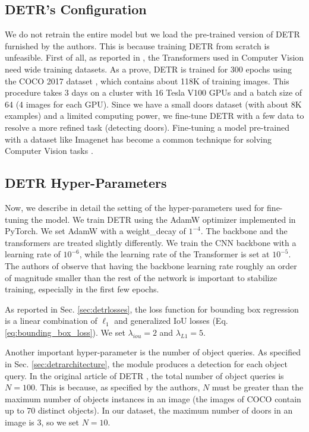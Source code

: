 \subsection{DETR's Configuration}
\label{sec:detr_configuration}
We do not retrain the entire model but we load the pre-trained version of DETR furnished by the authors. This is because training DETR from scratch is unfeasible. First of all, as reported in \cite{surveytransformer}, the Transformers used in Computer Vision need wide training datasets. As a prove, DETR is trained for 300 epochs using the COCO 2017 dataset \cite{coco}, which contains about 118K of training images. This procedure takes 3 days on a cluster with 16 Tesla V100 GPUs and a batch size of 64 (4 images for each GPU). Since we have a small doors dataset (with about 8K examples) and a limited computing power, we fine-tune DETR with a few data to resolve a more refined task (detecting doors). Fine-tuning a model pre-trained with a dataset like Imagenet \cite{imagenet} has become a common technique for solving Computer Vision tasks \cite{verydeepimagenet, resnet, fasterrcnn, yolo, yolov2}.

\subsection{DETR Hyper-Parameters}
Now, we describe in detail the setting of the hyper-parameters used for fine-tuning the model. We train DETR using the AdamW  \cite{adamw} optimizer implemented in PyTorch. We set AdamW with a \textsf{weight\_decay} of $1^{-4}$. The backbone and the transformers are treated slightly differently.  We train the CNN backbone with a learning rate of $10^{-6}$, while the learning rate of the Transformer is set at $10^{-5}$. The authors of \cite{detr} observe that having the backbone learning rate roughly an order of magnitude smaller than the rest of the network is important to stabilize training, especially in the first few epochs. 

As reported in Sec. \ref{sec:detrlosses}, the loss function for bounding box regression is a linear combination of $\ell_1$ and generalized IoU \cite{generalizediou} losses (Eq. \ref{eq:bounding_box_loss}). We set $\lambda_{iou} = 2$ and $\lambda_{L1} = 5$.

Another important hyper-parameter is the number of object queries. As specified in Sec. \ref{sec:detrarchitecture}, the module produces a detection for each object query. In the original article of DETR \cite{detr}, the total number of object queries is  $N = 100$. This is because, as specified by the authors, $N$ must be greater than the maximum number of objects instances in an image (the images of COCO contain up to 70 distinct objects). In our dataset, the maximum number of doors in an image is 3, so we set $N = 10$.

